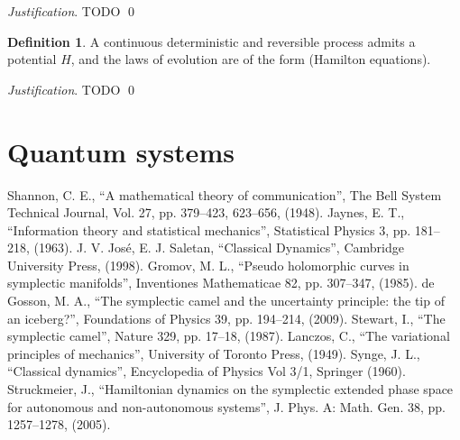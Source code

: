 \documentclass[aps,pra,10pt,twocolumn,floatfix,nofootinbib]{revtex4-1}
\theoremstyle{definition}
\newtheorem{defn}[prop]{Definition}
\newenvironment{justification}{\emph{Justification}.}{\qed}
\begin{document}
\begin{justification}
	TODO
\end{justification}

\begin{defn}\label{hamiltonian}
	A continuous deterministic and reversible process admits a potential $H$, and the laws of evolution are of the form (Hamilton equations).
\end{defn}

\begin{justification}
	TODO
\end{justification}



\section{Quantum systems}


\begin{thebibliography}{0}

 Shannon, C. E., ``A mathematical theory of communication'', The Bell System Technical Journal, Vol. 27, pp. 379--423, 623--656, (1948).
 Jaynes, E. T., ``Information theory and statistical mechanics'', Statistical Physics 3, pp. 181--218, (1963).
 J. V. Jos\'{e}, E. J. Saletan, ``Classical Dynamics'', Cambridge University Press, (1998).
 Gromov, M. L., ``Pseudo holomorphic curves in symplectic manifolds'', Inventiones Mathematicae 82, pp. 307--347, (1985).
 de Gosson, M. A., ``The symplectic camel and the uncertainty principle: the tip of an iceberg?'', Foundations of Physics 39, pp. 194--214, (2009).
 Stewart, I., ``The symplectic camel'', Nature 329, pp. 17--18, (1987).
 Lanczos, C., ``The variational principles of mechanics'', University of Toronto Press, (1949).
 Synge, J. L., ``Classical dynamics'', Encyclopedia of Physics Vol 3/1, Springer (1960).
 Struckmeier, J., ``Hamiltonian dynamics on the symplectic extended phase space for autonomous and non-autonomous systems'', J. Phys. A: Math. Gen. 38, pp. 1257--1278, (2005).

\end{thebibliography}
\end{document}
